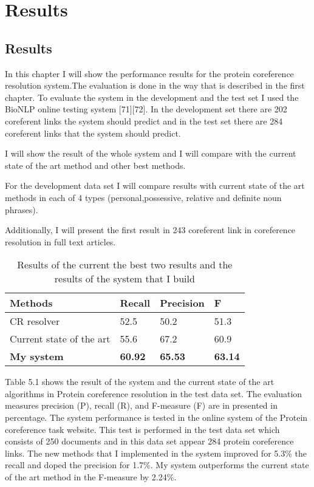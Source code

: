 \chapter{Results}
\label{Results}
\section{Results}

In this chapter I will show the performance results for the protein coreference resolution system.The evaluation is done in the way that is described in the first chapter. To evaluate the system in the development and the test set I used the BioNLP online testing system [71][72]. In the development set there are 202 coreferent links the system should predict and in the test set there are 284 coreferent links that the system should predict.  

I will show the result of the whole system and I will compare with the current state of the art method and other best methods.

For the development data set I will compare results with current state of the art methods in each of 4 types (personal,possessive, relative and definite noun phrases). 

Additionally, I will present the first result in 243 coreferent link in coreference resolution in full text articles.

\begin{table}[h]
   \begin{center}
	 \begin{tabular}{l | C{1.7cm} C{2cm} C{1.7cm}}
 		\hline
  		Methods & Recall & Precision & F  \\
 		\hline
 		CR resolver & 52.5 & 50.2 & 51.3  \\
 		\hline 
 		Current state of the art & 55.6 & 67.2 & 60.9 \\
 		\hline   
 		\textbf{My system} & \textbf{60.92} & \textbf{65.53} & \textbf{63.14} \\
 		\hline  
 	\end{tabular}
  \end{center} 
  \caption{ Results of the current the best two results and the results of the system that I build}
\end{table}
Table 5.1 shows the result of the system and the current state of the art algorithms in Protein coreference resolution in the test data set. The evaluation measures precision (P), recall (R), and F-measure (F)  are in presented in percentage. The system performance is tested in the online system of the Protein coreference task website. This test is performed in the test data set which consists of 250 documents and in this data set appear 284 protein coreference links. The new methods that I implemented in the system improved for 5.3\% the recall and doped the precision for 1.7\%. My system outperforms the current state of the art  method in the F-measure by 2.24\%.

